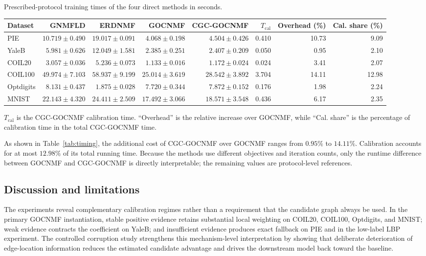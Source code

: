 \documentclass[11pt]{article}
\newenvironment{widetable}
  {\begin{strip}\centering\captionsetup{type=table}}
  {\end{strip}}
\theoremstyle{remark}
\begin{document}
\begin{widetable}
\centering
\caption{Prescribed-protocol training times of the four direct methods
in seconds.}
\label{tab:timing}
\scriptsize
\setlength{\tabcolsep}{10.5pt}
\begin{tabular}{lrrrrrrr}
\toprule
Dataset & GNMFLD & ERDNMF & GOCNMF & CGC-GOCNMF & $T_{\mathrm{cal}}$ & Overhead (\%) & Cal. share (\%) \\
\midrule
PIE & $10.719\pm0.490$ & $19.017\pm0.091$ & $4.068\pm0.198$ & $4.504\pm0.426$ & 0.410 & 10.73 & 9.09 \\
YaleB & $5.981\pm0.626$ & $12.049\pm1.581$ & $2.385\pm0.251$ & $2.407\pm0.209$ & 0.050 & 0.95 & 2.10 \\
COIL20 & $3.057\pm0.036$ & $5.236\pm0.073$ & $1.133\pm0.016$ & $1.172\pm0.024$ & 0.024 & 3.41 & 2.07 \\
COIL100 & $49.974\pm7.103$ & $58.937\pm9.199$ & $25.014\pm3.619$ & $28.542\pm3.892$ & 3.704 & 14.11 & 12.98 \\
Optdigits & $8.131\pm0.437$ & $1.875\pm0.028$ & $7.720\pm0.344$ & $7.872\pm0.152$ & 0.176 & 1.98 & 2.24 \\
MNIST & $22.143\pm4.320$ & $24.411\pm2.509$ & $17.492\pm3.066$ & $18.571\pm3.548$ & 0.436 & 6.17 & 2.35 \\
\bottomrule
\end{tabular}%

\vspace{1mm}
\parbox{0.98\linewidth}{\footnotesize $T_{\mathrm{cal}}$ is the CGC-GOCNMF calibration time. ``Overhead'' is the relative increase over GOCNMF, while ``Cal. share'' is the percentage of calibration time in the total CGC-GOCNMF time.}
\end{widetable}

As shown in Table~\ref{tab:timing}, the additional cost of CGC-GOCNMF over GOCNMF ranges from $0.95\%$ to $14.11\%$. Calibration accounts for at most $12.98\%$ of its total running time. Because the methods use different objectives and iteration counts, only
the runtime difference between GOCNMF and CGC-GOCNMF is directly
interpretable; the remaining values are protocol-level references.
\subsection{Discussion and limitations}

The experiments reveal complementary calibration regimes rather than a requirement that the candidate graph always be used. In the primary GOCNMF instantiation, stable positive evidence retains substantial local weighting on COIL20, COIL100, Optdigits, and MNIST; weak evidence contracts the coefficient on YaleB; and insufficient evidence produces exact fallback on PIE and in the low-label LBP experiment. The controlled corruption study strengthens this mechanism-level interpretation by showing that deliberate deterioration of edge-location information reduces the estimated candidate advantage and drives the downstream model back toward the baseline.
\end{document}
